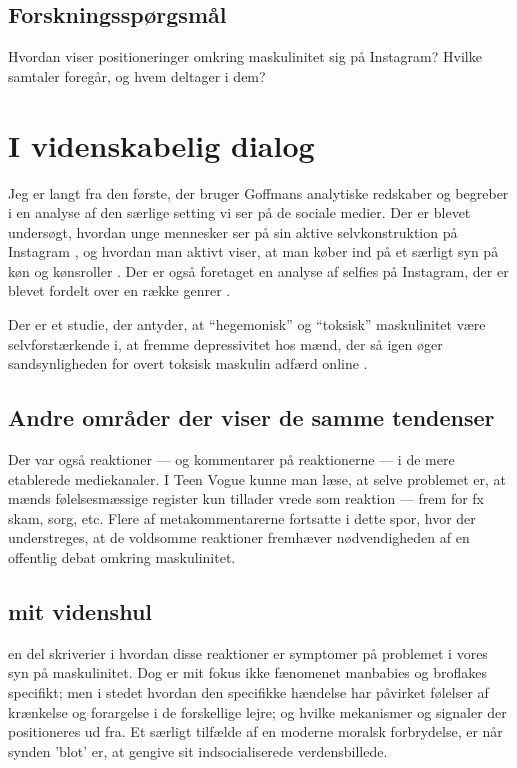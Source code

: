\subsection{Forskningsspørgsmål}
Hvordan viser positioneringer omkring maskulinitet sig på 
Instagram? Hvilke samtaler foregår, og hvem deltager i dem?

\section{I videnskabelig dialog}

Jeg er langt fra den første, der bruger Goffmans analytiske 
redskaber og begreber i en analyse af den særlige setting vi ser 
på de sociale medier. Der er blevet undersøgt, hvordan unge 
mennesker ser på sin aktive selvkonstruktion på Instagram 
\autocite{seehaferNOFILTERExplorationInstagram2017a}, og hvordan 
man aktivt viser, at man køber ind på et særligt syn på køn og 
kønsroller \autocite{bakerGoodMorningFitfam2018}. Der er også 
foretaget en analyse af selfies på Instagram, der er blevet 
fordelt over en række genrer \autocite{MISSING}.

Der er et studie, der antyder, at “hegemonisk” og “toksisk” 
maskulinitet være selvforstærkende i, at fremme depressivitet hos 
mænd, der så igen øger sandsynligheden for overt toksisk maskulin 
adfærd online \autocite{parentSocialMediaBehavior2018}.

\subsection{Andre områder der viser de samme tendenser} 

Der var også reaktioner — og kommentarer på reaktionerne — i de
mere etablerede mediekanaler. I Teen Vogue kunne man læse, at
selve problemet er, at mænds følelsesmæssige register kun tillader
vrede som reaktion — frem for fx skam, sorg, etc. Flere af
metakommentarerne fortsatte i dette spor, hvor der understreges,
at de voldsomme reaktioner fremhæver nødvendigheden af en
offentlig debat omkring maskulinitet. 

\subsection{mit videnshul}

en del skriverier i hvordan disse reaktioner er symptomer på
problemet i vores syn på maskulinitet. Dog er mit fokus ikke
fænomenet manbabies og broflakes specifikt; men i stedet hvordan
den specifikke hændelse har påvirket følelser af krænkelse og
forargelse i de forskellige lejre; og hvilke mekanismer og
signaler der positioneres ud fra. Et særligt tilfælde af en
moderne moralsk forbrydelse, er når synden 'blot' er, at gengive
sit indsocialiserede verdensbillede.

